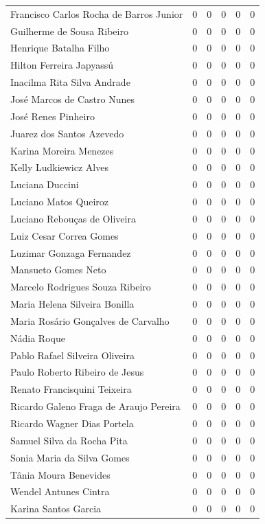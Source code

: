 \documentclass[12pt,brazil]{article}\usepackage[]{graphicx}\usepackage[]{xcolor}
\begin{document}
\begin{longtable}{lrrrrr}
Francisco Carlos Rocha de Barros Junior & 0 & 0 & 0 & 0 & 0 \\
Guilherme de Sousa Ribeiro & 0 & 0 & 0 & 0 & 0 \\
Henrique Batalha Filho & 0 & 0 & 0 & 0 & 0 \\
Hilton Ferreira Japyassú & 0 & 0 & 0 & 0 & 0 \\
Inacilma Rita Silva Andrade & 0 & 0 & 0 & 0 & 0 \\
José Marcos de Castro Nunes & 0 & 0 & 0 & 0 & 0 \\
José Renes Pinheiro & 0 & 0 & 0 & 0 & 0 \\
Juarez dos Santos Azevedo & 0 & 0 & 0 & 0 & 0 \\
Karina Moreira Menezes & 0 & 0 & 0 & 0 & 0 \\
Kelly Ludkiewicz Alves & 0 & 0 & 0 & 0 & 0 \\
Luciana Duccini & 0 & 0 & 0 & 0 & 0 \\
Luciano Matos Queiroz & 0 & 0 & 0 & 0 & 0 \\
Luciano Rebouças de Oliveira & 0 & 0 & 0 & 0 & 0 \\
Luiz Cesar Correa Gomes & 0 & 0 & 0 & 0 & 0 \\
Luzimar Gonzaga Fernandez & 0 & 0 & 0 & 0 & 0 \\
Mansueto Gomes Neto & 0 & 0 & 0 & 0 & 0 \\
Marcelo Rodrigues Souza Ribeiro & 0 & 0 & 0 & 0 & 0 \\
Maria Helena Silveira Bonilla & 0 & 0 & 0 & 0 & 0 \\
Maria Rosário Gonçalves de Carvalho & 0 & 0 & 0 & 0 & 0 \\
Nádia Roque & 0 & 0 & 0 & 0 & 0 \\
Pablo Rafael Silveira Oliveira & 0 & 0 & 0 & 0 & 0 \\
Paulo Roberto Ribeiro de Jesus & 0 & 0 & 0 & 0 & 0 \\
Renato Francisquini Teixeira & 0 & 0 & 0 & 0 & 0 \\
Ricardo Galeno Fraga de Araujo Pereira & 0 & 0 & 0 & 0 & 0 \\
Ricardo Wagner Dias Portela & 0 & 0 & 0 & 0 & 0 \\
Samuel Silva da Rocha Pita & 0 & 0 & 0 & 0 & 0 \\
Sonia Maria da Silva Gomes & 0 & 0 & 0 & 0 & 0 \\
Tânia Moura Benevides & 0 & 0 & 0 & 0 & 0 \\
Wendel Antunes Cintra & 0 & 0 & 0 & 0 & 0 \\
Karina Santos Garcia & 0 & 0 & 0 & 0 & 0 \\

\end{longtable}
\end{document}
